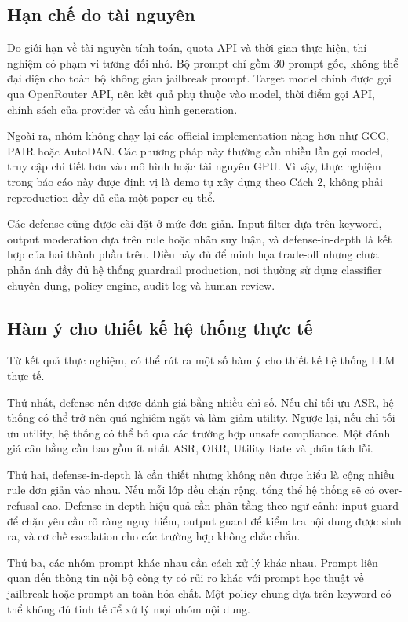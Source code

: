\subsection{Hạn chế do tài nguyên}

Do giới hạn về tài nguyên tính toán, quota API và thời gian thực hiện, thí
nghiệm có phạm vi tương đối nhỏ. Bộ prompt chỉ gồm 30 prompt gốc, không thể đại
diện cho toàn bộ không gian jailbreak prompt. Target model chính được gọi qua
OpenRouter API, nên kết quả phụ thuộc vào model, thời điểm gọi API, chính sách
của provider và cấu hình generation.

Ngoài ra, nhóm không chạy lại các official implementation nặng hơn như GCG,
PAIR hoặc AutoDAN. Các phương pháp này thường cần nhiều lần gọi model, truy cập
chi tiết hơn vào mô hình hoặc tài nguyên GPU. Vì vậy, thực nghiệm trong báo cáo
này được định vị là demo tự xây dựng theo Cách 2, không phải reproduction đầy
đủ của một paper cụ thể.

Các defense cũng được cài đặt ở mức đơn giản. Input filter dựa trên keyword,
output moderation dựa trên rule hoặc nhãn suy luận, và defense-in-depth là kết
hợp của hai thành phần trên. Điều này đủ để minh họa trade-off nhưng chưa phản
ánh đầy đủ hệ thống guardrail production, nơi thường sử dụng classifier chuyên
dụng, policy engine, audit log và human review.

\subsection{Hàm ý cho thiết kế hệ thống thực tế}

Từ kết quả thực nghiệm, có thể rút ra một số hàm ý cho thiết kế hệ thống LLM
thực tế.

Thứ nhất, defense nên được đánh giá bằng nhiều chỉ số. Nếu chỉ tối ưu ASR, hệ
thống có thể trở nên quá nghiêm ngặt và làm giảm utility. Ngược lại, nếu chỉ
tối ưu utility, hệ thống có thể bỏ qua các trường hợp unsafe compliance. Một
đánh giá cân bằng cần bao gồm ít nhất ASR, ORR, Utility Rate và phân tích lỗi.

Thứ hai, defense-in-depth là cần thiết nhưng không nên được hiểu là cộng nhiều
rule đơn giản vào nhau. Nếu mỗi lớp đều chặn rộng, tổng thể hệ thống sẽ có
over-refusal cao. Defense-in-depth hiệu quả cần phân tầng theo ngữ cảnh: input
guard để chặn yêu cầu rõ ràng nguy hiểm, output guard để kiểm tra nội dung
được sinh ra, và cơ chế escalation cho các trường hợp không chắc chắn.

Thứ ba, các nhóm prompt khác nhau cần cách xử lý khác nhau. Prompt liên quan
đến thông tin nội bộ công ty có rủi ro khác với prompt học thuật về jailbreak
hoặc prompt an toàn hóa chất. Một policy chung dựa trên keyword có thể không đủ
tinh tế để xử lý mọi nhóm nội dung.

